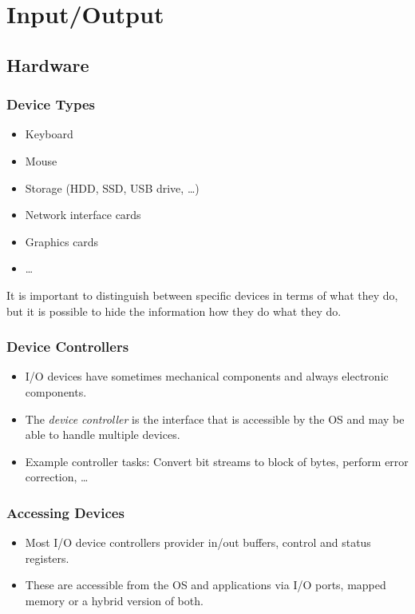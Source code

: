 \chapter{Input/Output}
    \section{Hardware}
        \subsection{Device Types}
            \begin{itemize}
            	\item Keyboard
            	\item Mouse
            	\item Storage (HDD, SSD, USB drive, \dots)
            	\item Network interface cards
            	\item Graphics cards
            	\item \dots
            \end{itemize}
        
            It is important to distinguish between specific devices in terms of what they do, but it is possible to hide the information how they do what they do.

        \subsection{Device Controllers}
            \begin{itemize}
            	\item I/O devices have sometimes mechanical components and always electronic components.
            	\item The \textit{device controller} is the interface that is accessible by the OS and may be able to handle multiple devices.
            	\item Example controller tasks: Convert bit streams to block of bytes, perform error correction, \dots
            \end{itemize}

        \subsection{Accessing Devices}
            \begin{itemize}
            	\item Most I/O device controllers provider in/out buffers, control and status registers.
            	\item These are accessible from the OS and applications via I/O ports, mapped memory or a hybrid version of both.
            \end{itemize}
        
